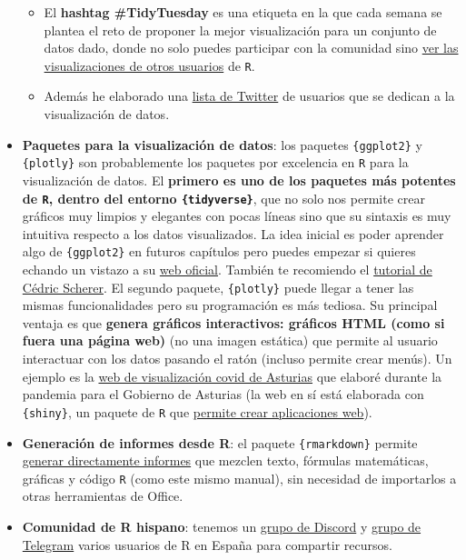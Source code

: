 \documentclass[11pt,]{book}
\providecommand{\tightlist}{%
  \setlength{\itemsep}{0pt}\setlength{\parskip}{0pt}}
\begin{document}
\begin{itemize}
  \begin{itemize}
  \tightlist
  \item
    El \textbf{hashtag \#TidyTuesday} es una etiqueta en la que cada semana se plantea el reto de proponer la mejor visualización para un conjunto de datos dado, donde no solo puedes participar con la comunidad sino \href{https://github.com/rfordatascience/tidytuesday}{ver las visualizaciones de otros usuarios} de \texttt{R}.
  \item
    Además he elaborado una \href{https://twitter.com/i/lists/1324478481338683392?s=20}{lista de Twitter} de usuarios que se dedican a la visualización de datos.
  \end{itemize}
\item
  \textbf{Paquetes para la visualización de datos}: los paquetes \texttt{\{ggplot2\}} y \texttt{\{plotly\}} son probablemente los paquetes por excelencia en \texttt{R} para la visualización de datos. El \textbf{primero es uno de los paquetes más potentes de \texttt{R}, dentro del entorno \texttt{\{tidyverse\}}}, que no solo nos permite crear gráficos muy limpios y elegantes con pocas líneas sino que su sintaxis es muy intuitiva respecto a los datos visualizados. La idea inicial es poder aprender algo de \texttt{\{ggplot2\}} en futuros capítulos pero puedes empezar si quieres echando un vistazo a su \href{https://ggplot2.tidyverse.org/}{web oficial}. También te recomiendo el \href{https://www.cedricscherer.com/2019/08/05/a-ggplot2-tutorial-for-beautiful-plotting-in-r/}{tutorial de Cédric Scherer}. El segundo paquete, \texttt{\{plotly\}} puede llegar a tener las mismas funcionalidades pero su programación es más tediosa. Su principal ventaja es que \textbf{genera gráficos interactivos: gráficos HTML (como si fuera una página web)} (no una imagen estática) que permite al usuario interactuar con los datos pasando el ratón (incluso permite crear menús). Un ejemplo es la \href{https://dgspasturias.shinyapps.io/panel_de_indicadores_asturias/}{web de visualización covid de Asturias} que elaboré durante la pandemia para el Gobierno de Asturias (la web en sí está elaborada con \texttt{\{shiny\}}, un paquete de \texttt{R} que \href{https://shiny.rstudio.com/tutorial/}{permite crear aplicaciones web}).
\item
  \textbf{Generación de informes desde R}: el paquete \texttt{\{rmarkdown\}} permite \href{https://rmarkdown.rstudio.com/}{generar directamente informes} que mezclen texto, fórmulas matemáticas, gráficas y código \texttt{R} (como este mismo manual), sin necesidad de importarlos a otras herramientas de Office.
\item
  \textbf{Comunidad de R hispano}: tenemos un \href{https://discord.gg/7ueKQqeaGr}{grupo de Discord} y \href{https://t.me/hispanoverse}{grupo de Telegram} varios usuarios de R en España para compartir recursos.
\end{itemize}


\end{document}
